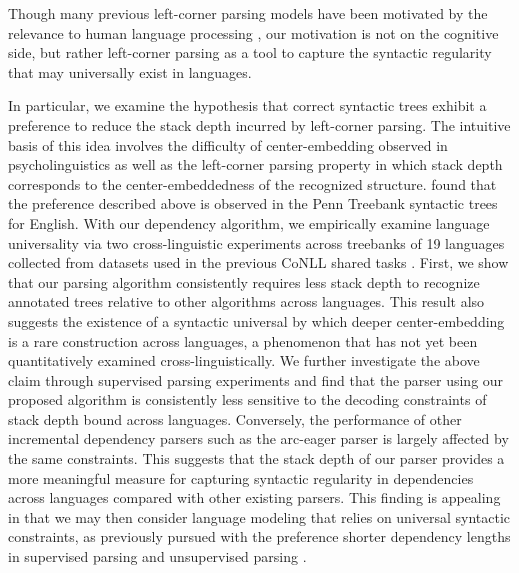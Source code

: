 \documentclass[english]{jnlp_1.4}
\begin{document}
Though many previous left-corner parsing models have been motivated by the relevance to human language processing \cite{Roark:2001:RPP:933637,journals/coling/SchulerAMS10,vanschijndel-schuler:2013:NAACL-HLT}, our motivation is not on the cognitive side, but rather left-corner parsing as a tool to capture the syntactic regularity that may universally exist in languages.

In particular, we examine the hypothesis that correct syntactic trees exhibit a preference to reduce the stack depth incurred by left-corner parsing.
The intuitive basis of this idea involves the difficulty of center-embedding observed in psycholinguistics \cite{Gibson2000The-dependency-} as well as the left-corner parsing property in which stack depth corresponds to the center-embeddedness of the recognized structure.
 found that the preference described above is observed in the Penn Treebank syntactic trees for English.
With our dependency algorithm, we empirically examine language universality via two cross-linguistic experiments across treebanks of 19 languages collected from datasets used in the previous CoNLL shared tasks \cite{buchholz-marsi:2006:CoNLL-X,nivre-EtAl:2007:EMNLP-CoNLL2007}.
First, we show that our parsing algorithm consistently requires less stack depth to recognize annotated trees relative to other algorithms across languages.
This result also suggests the existence of a syntactic universal by which deeper center-embedding is a rare construction across languages, a phenomenon that has not yet been quantitatively examined cross-linguistically.
We further investigate the above claim through supervised parsing experiments and find that the parser using our proposed algorithm is consistently less sensitive to the decoding constraints of stack depth bound across languages.
Conversely, the performance of other incremental dependency parsers such as the arc-eager parser is largely affected by the same constraints.
This suggests that the stack depth of our parser provides a more meaningful measure for capturing syntactic regularity in dependencies across languages compared with other existing parsers.
This finding is appealing in that we may then consider language modeling that relies on universal syntactic constraints, as previously pursued with the preference shorter dependency lengths in supervised parsing \cite{eisner2010} and unsupervised parsing \cite{smith-eisner-2006-acl-sa}.
\end{document}
